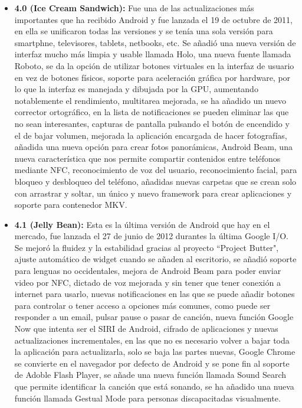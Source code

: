 \begin{itemize}
	\item \textbf{4.0 (Ice Cream Sandwich):} Fue una de las actualizaciones más importantes que ha recibido Android y fue lanzada el 19 de octubre de 2011, en ella se unificaron todas las versiones y se tenía una sola versión para smartphne, televisores, tablets, netbooks, etc. Se añadió una nueva versión de interfaz mucho más limpia y usable llamada Holo, una nueva fuente llamada Roboto, se da la opción de utilizar botones virtuales en la interfaz de usuario en vez de botones físicos, soporte para aceleración gráfica por hardware, por lo que la interfaz es manejada y dibujada por la GPU, aumentando notablemente el rendimiento, multitarea mejorada, se ha añadido un nuevo corrector ortográfico, en la lista de notificaciones se pueden eliminar las que no sean interesantes, capturas de pantalla pulsando el botón de encendido y el de bajar volumen, mejorada la aplicación encargada de hacer fotografías, añadida una nueva opción para crear fotos panorámicas, Android Beam, una nueva característica que nos permite compartir contenidos entre teléfonos mediante NFC, reconocimiento de voz del usuario, reconocimiento facial, para bloqueo y desbloqueo del teléfono, añadidas nuevas carpetas que se crean solo con arrastrar y soltar, un único y nuevo framework para crear aplicaciones y soporte para contenedor MKV.

	\item \textbf{4.1 (Jelly Bean):} Esta es la última versión de Android que hay en el mercado, fue lanzada el 27 de junio de 2012 durantes la última Google I/O. Se mejoró la fluidez y la estabilidad gracias al proyecto ``Project Butter", ajuste automático de widget cuando se añaden al escritorio, se añadió soporte para lenguas no occidentales, mejora de Android Beam para poder enviar video por NFC, dictado de voz mejorada y sin tener que tener conexión a internet para usarlo, nuevas notificaciones en las que se puede añadir botones para controlar o tener acceso a opciones más comunes, como puede ser responder a un email, pulsar pause o pasar de canción, nueva función Google Now que intenta ser el SIRI de Android, cifrado de aplicaciones y nuevas actualizaciones incrementales, en las que no es necesario volver a bajar toda la aplicación para actualizarla, solo se baja las partes nuevas, Google Chrome se convierte en el navegador por defecto de Android y se pone fin al soporte de Adoble Flash Player, se añade una nueva función llamada Sound Search que permite identificar la canción que está sonando, se ha añadido una nueva función llamada Gestual Mode para personas discapacitadas visualmente.
\end{itemize}


